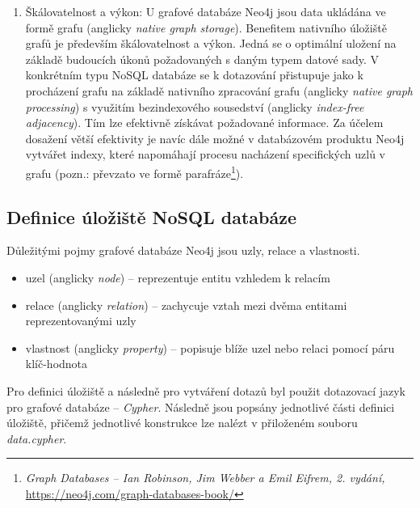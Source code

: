 \documentclass[a4paper, 11pt]{article}
\begin{document}
\begin{enumerate}
        \item Škálovatelnost a výkon: U grafové databáze Neo4j jsou data ukládána ve formě grafu (anglicky \textit{native graph storage}). Benefitem nativního úložiště grafů je především škálovatelnost a výkon. Jedná se o optimální uložení na základě budoucích úkonů požadovaných s daným typem datové sady. V konkrétním typu NoSQL databáze se k dotazování přistupuje jako k procházení grafu na základě nativního zpracování grafu (anglicky \textit{native graph processing}) s využitím bezindexového sousedství (anglicky \textit{index-free adjacency}). Tím lze efektivně získávat požadované informace. Za účelem dosažení větší efektivity je navíc dále možné v databázovém produktu Neo4j vytvářet indexy, které napomáhají procesu nacházení specifických uzlů v grafu (pozn.: převzato ve formě parafráze\footnote{\textit{Graph Databases --  Ian Robinson, Jim Webber a Emil Eifrem, 2. vydání,} \url{https://neo4j.com/graph-databases-book/}}).

    \end{enumerate}

    
        
    \subsection{Definice úložiště NoSQL databáze}
    Důležitými pojmy grafové databáze Neo4j jsou uzly, relace a vlastnosti.

    \begin{itemize}
        \item uzel (anglicky \textit{node}) -- reprezentuje entitu vzhledem k relacím
        \item relace (anglicky \textit{relation}) -- zachycuje vztah mezi dvěma entitami reprezentovanými uzly
        \item vlastnost (anglicky \textit{property}) -- popisuje blíže uzel nebo relaci pomocí páru klíč-hodnota
    \end{itemize}

    Pro definici úložiště a následně pro vytváření dotazů byl použit dotazovací jazyk pro grafové databáze -- \textit{Cypher}. Následně jsou popsány jednotlivé části definici úložiště, přičemž jednotlivé konstrukce lze nalézt v přiloženém souboru \textit{data.cypher}.
\end{document}
